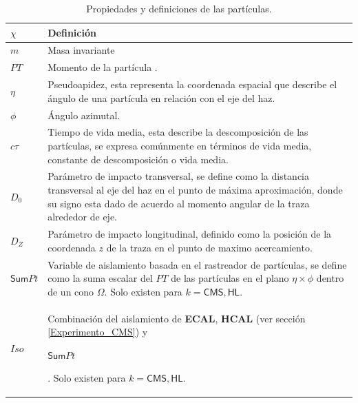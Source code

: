 \begin{table}[!h]
\centering
\begin{tabular}{|p{1.2cm}|p{13cm}|}
\toprule
$\chi$ & Definición\\
\midrule
$m$ & Masa invariante\\
$PT$ & Momento de la partícula%
.\\
$\eta$ & Pseudoapidez, esta representa la coordenada espacial que describe el ángulo de una partícula en relación con el eje del haz. \\%
$\phi$ & Ángulo azimutal.\\
$c\tau$ & Tiempo de vida media, esta describe la descomposición de las partículas, se expresa comúnmente en términos de vida media, constante de descomposición o vida media. \\

$D_0$ & Parámetro de impacto transversal, se define como la distancia transversal al eje del haz en el punto de máxima aproximación, donde su signo esta dado de acuerdo al momento angular de la traza alrededor de eje.\\

$D_Z$ & Parámetro de impacto longitudinal, definido como la posición de la coordenada $z$ de la traza en el punto de maximo acercamiento.\\
\begin{small}$\textsf{Sum}Pt$\end{small} & Variable de aislamiento basada en el rastreador de partículas, se define como la suma escalar del $PT$ de las partículas en el plano $\eta \times \phi$ dentro de un cono $\Omega$. Solo existen para $k=\textsf{CMS},  \textsf{HL}$. \\
$Iso$ & Combinación del aislamiento de \textbf{ECAL}, \textbf{HCAL} (ver sección \ref{Experimento_CMS}) y \begin{small}$\textsf{Sum}Pt$\end{small}. Solo existen para $k=\textsf{CMS},  \textsf{HL}$.\\

\bottomrule
\end{tabular}
\caption{Propiedades y definiciones de las partículas.}
\label{propiedades}
\end{table}


